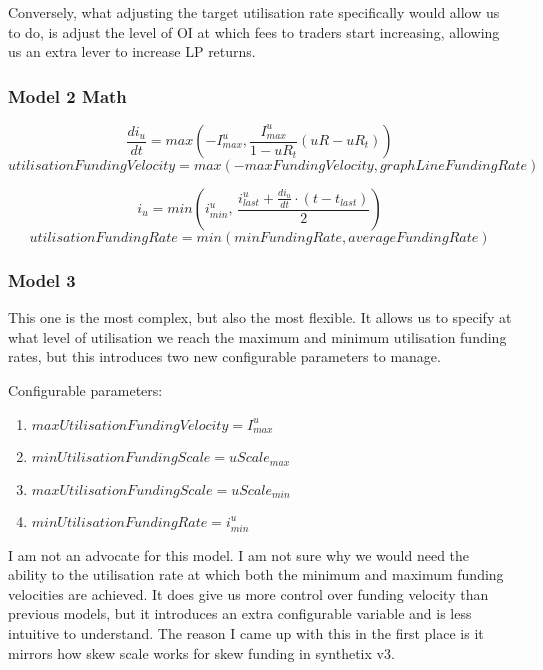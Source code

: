 \documentclass[]{article}
\begin{document}
Conversely, what adjusting the target utilisation rate specifically would allow us to do, is adjust the level of OI at which fees to traders start increasing, allowing us an extra lever to increase LP returns.

\subsubsection{Model 2 Math}

$$
\frac{di_u}{dt} = max\left(-I^u_{max}, \frac{I^u_{max}}{1 - uR_t}(uR - uR_t)\right)
$$
$$
utilisationFundingVelocity = max(-maxFundingVelocity, graphLineFundingRate)
$$

$$
i_u = min\left(i^u_{min},\, \frac{i^u_{last} + \frac{di_u}{dt} \cdot (t - t_{last})}{2}\right)
$$
$$
utilisationFundingRate = min(minFundingRate, averageFundingRate)
$$
\subsubsection{Model 3}

This one is the most complex, but also the most flexible. It allows us to specify at what level of utilisation we reach the maximum and minimum utilisation funding rates, but this introduces two new configurable parameters to manage.

Configurable parameters:
\begin{enumerate}
\item $maxUtilisationFundingVelocity = I^u_{max}$
\item $minUtilisationFundingScale = uScale_{max}$
\item $maxUtilisationFundingScale = uScale_{min}$
\item $minUtilisationFundingRate = i^u_{min}$
\end{enumerate}


I am not an advocate for this model. I am not sure why we would need the ability to the utilisation rate at which both the minimum and maximum funding velocities are achieved. It does give us more control over funding velocity than previous models, but it introduces an extra configurable variable and is less intuitive to understand. The reason I came up with this in the first place is it mirrors how skew scale works for skew funding in synthetix v3.
\end{document}
